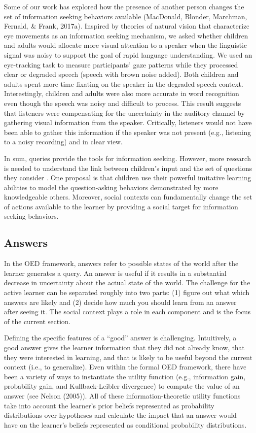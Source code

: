 \documentclass[oneside]{report}
\begin{document}
Some of our work has explored how the presence of another person changes
the set of information seeking behaviors available (MacDonald, Blonder,
Marchman, Fernald, \& Frank, 2017a). Inspired by theories of natural
vision that characterize eye movements as an information seeking
mechanism, we asked whether children and adults would allocate more
visual attention to a speaker when the linguistic signal was noisy to
support the goal of rapid language understanding. We used an
eye-tracking task to measure participants' gaze patterns while they
processed clear or degraded speech (speech with brown noise added). Both
children and adults spent more time fixating on the speaker in the
degraded speech context. Interestingly, children and adults were also
more accurate in word recognition even though the speech was noisy and
difficult to process. This result suggests that listeners were
compensating for the uncertainty in the auditory channel by gathering
visual information from the speaker. Critically, listeners would not
have been able to gather this information if the speaker was not present
(e.g., listening to a noisy recording) and in clear view.

In sum, queries provide the tools for information seeking. However, more
research is needed to understand the link between children's input and
the set of questions they consider . One proposal is that children use
their powerful imitative learning abilities to model the question-asking
behaviors demonstrated by more knowledgeable others. Moreover, social
contexts can fundamentally change the set of actions available to the
learner by providing a social target for information seeking behaviors.

\subsection{Answers}\label{answers}

In the OED framework, answers refer to possible states of the world
after the learner generates a query. An answer is useful if it results
in a substantial decrease in uncertainty about the actual state of the
world. The challenge for the active learner can be separated roughly
into two parts: (1) figure out what which answers are likely and (2)
decide how much you should learn from an answer after seeing it. The
social context plays a role in each component and is the focus of the
current section.

Defining the specific features of a ``good'' answer is challenging.
Intuitively, a good answer gives the learner information that they did
not already know, that they were interested in learning, and that is
likely to be useful beyond the current context (i.e., to generalize).
Even within the formal OED framework, there have been a variety of ways
to instantiate the utility function (e.g., information gain, probability
gain, and Kullback-Leibler divergence) to compute the value of an answer
(see Nelson (2005)). All of these information-theoretic utility
functions take into account the learner's prior beliefs represented as
probability distributions over hypotheses and calculate the impact that
an answer would have on the learner's beliefs represented as conditional
probability distributions.
\end{document}
